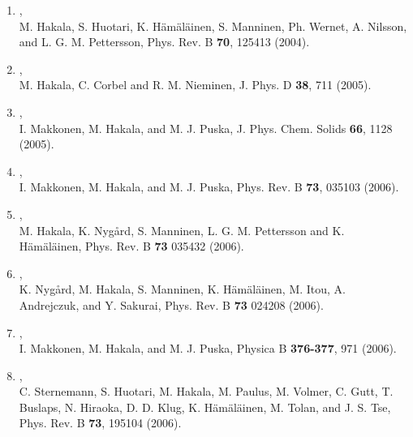 \documentclass[12pt,a4]{report}
\begin{document}
\begin{enumerate}
\item{},\\ M. Hakala, S. Huotari,
K. H\"am\"al\"ainen, S. Manninen, Ph. Wernet, A. Nilsson, and
L. G. M. Pettersson, Phys. Rev. B {\bf 70}, 125413 (2004).

\item{},\\ M. Hakala, C. Corbel and R. M. Nieminen,
J. Phys. D {\bf 38}, 711 (2005).

\item{},\\ I. Makkonen, M. Hakala, and
M. J. Puska, J. Phys. Chem. Solids {\bf 66}, 1128 (2005).

\item{},\\ I. Makkonen, M. Hakala, and
M. J. Puska, Phys. Rev. B {\bf 73}, 035103 (2006).

\item{},\\ M. Hakala, K. Nyg\aa rd, S. Manninen, L. G. M. Pettersson and K. H\"am\"al\"ainen, 
Phys. Rev. B {\bf 73} 035432 (2006).

\item{},\\
K. Nyg\aa rd, M. Hakala, S. Manninen, K. H\"am\"al\"ainen, M. Itou,
A. Andrejczuk, and Y. Sakurai, 
Phys. Rev. B {\bf 73} 024208 (2006).

\item{},\\ I. Makkonen, M. Hakala, and
M. J. Puska, Physica B {\bf 376-377}, 971 (2006). %

\item{},\\ C. Sternemann,
S. Huotari, M. Hakala, M. Paulus,
M. Volmer, C. Gutt, T. Buslaps, N. Hiraoka, D. D. Klug, 
K. H{\"a}m{\"a}l{\"a}inen, M. Tolan, and J. S. Tse, 
Phys. Rev. B {\bf 73}, 195104 (2006). %


\end{enumerate}
\end{document}
